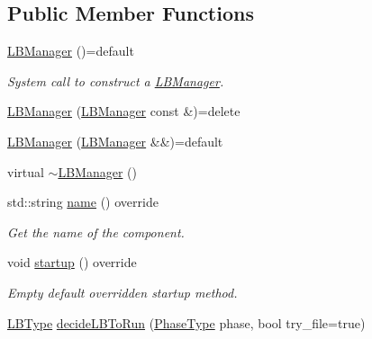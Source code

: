 \subsection*{Public Member Functions}
\begin{DoxyCompactItemize}
\item 
\hyperlink{structvt_1_1vrt_1_1collection_1_1balance_1_1_l_b_manager_a4adad6931af7d5ff2cb983859ed939f3}{L\+B\+Manager} ()=default
\begin{DoxyCompactList}\small\item\em System call to construct a {\ttfamily \hyperlink{structvt_1_1vrt_1_1collection_1_1balance_1_1_l_b_manager}{L\+B\+Manager}}. \end{DoxyCompactList}\item 
\hyperlink{structvt_1_1vrt_1_1collection_1_1balance_1_1_l_b_manager_af361eb6d3fa35d04873fcbe74b315d4a}{L\+B\+Manager} (\hyperlink{structvt_1_1vrt_1_1collection_1_1balance_1_1_l_b_manager}{L\+B\+Manager} const \&)=delete
\item 
\hyperlink{structvt_1_1vrt_1_1collection_1_1balance_1_1_l_b_manager_ab5efdf949166922f70cb49d171bf509a}{L\+B\+Manager} (\hyperlink{structvt_1_1vrt_1_1collection_1_1balance_1_1_l_b_manager}{L\+B\+Manager} \&\&)=default
\item 
virtual \hyperlink{structvt_1_1vrt_1_1collection_1_1balance_1_1_l_b_manager_aacec3c4ef45a173eae443722b2620d13}{$\sim$\+L\+B\+Manager} ()
\item 
std\+::string \hyperlink{structvt_1_1vrt_1_1collection_1_1balance_1_1_l_b_manager_a8e18e972cf9e8658da9577d45e090698}{name} () override
\begin{DoxyCompactList}\small\item\em Get the name of the component. \end{DoxyCompactList}\item 
void \hyperlink{structvt_1_1vrt_1_1collection_1_1balance_1_1_l_b_manager_add5427abf4c6e21e39f581635997ddac}{startup} () override
\begin{DoxyCompactList}\small\item\em Empty default overridden startup method. \end{DoxyCompactList}\item 
\hyperlink{namespacevt_1_1vrt_1_1collection_1_1balance_ac4f99693509affcc67db182d4aad9b5c}{L\+B\+Type} \hyperlink{structvt_1_1vrt_1_1collection_1_1balance_1_1_l_b_manager_a6c610e1c053f986932d8a59bb89eb37d}{decide\+L\+B\+To\+Run} (\hyperlink{namespacevt_a46ce6733d5cdbd735d561b7b4029f6d7}{Phase\+Type} phase, bool try\+\_\+file=true)

\end{DoxyCompactItemize}
